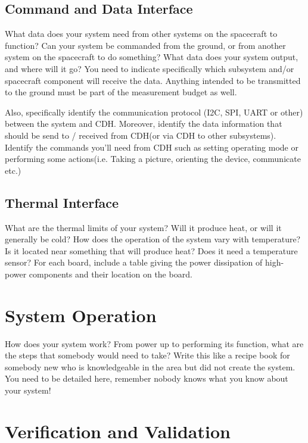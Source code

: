 \documentclass[12pt]{article}
\begin{document}
\subsection{Command and Data Interface}\label{sec2:cmd_interface}
What data does your system need from other systems on the spacecraft to function? Can your system be commanded from the ground, or from another system on the spacecraft to do something? What data does your system output, and where will it go? You need to indicate specifically which subsystem and/or spacecraft component will receive the data.  Anything intended to be transmitted to the ground must be part of the measurement budget as well.

Also, specifically identify the communication protocol (I2C, SPI, UART or other) between the system and CDH. Moreover, identify the data information that should be send to / received from CDH(or via CDH to other subsystems). Identify the commands you’ll need from CDH such as setting operating mode or performing some actions(i.e. Taking a picture, orienting the device, communicate etc.)

\subsection{Thermal Interface}\label{sec2:thermal_interface}

What are the thermal limits of your system? Will it produce heat, or will it generally be cold? How does the operation of the system vary with temperature? Is it located near something that will produce heat? Does it need a temperature sensor? For each board, include a table giving the power dissipation of high-power components and their location on the board. 

\section{System Operation}\label{sec:sys_operation}

How does your system work? From power up to performing its function, what are the steps that somebody would need to take? Write this like a recipe book for somebody new who is knowledgeable in the area but did not create the system. You need to be detailed here, remember nobody knows what you know about your system! 

\section{Verification and Validation}\label{sec:v_and_v}
\end{document}
